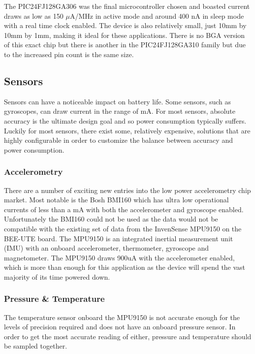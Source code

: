\documentclass[12pt,openany,a4paper]{book}
\begin{document}
		The PIC24FJ128GA306 was the final microcontroller chosen \cite{PIC24} and boasted current draws as low as 150 $\mu$A/MHz in active mode and around 400 nA in sleep mode with a real time clock enabled. The device is also relatively small, just 10mm by 10mm by 1mm, making it ideal for these applications. There is no BGA version of this exact chip but there is another in the PIC24FJ128GA310 family but due to the increased pin count is the same size. 
		
		
		\newpage
		\subsection{Sensors}
		Sensors can have a noticeable impact on battery life. Some sensors, such as gyroscopes, can draw current in the range of mA. For most sensors, absolute accuracy is the ultimate design goal and so power consumption typically suffers. Luckily for most sensors, there exist some, relatively expensive, solutions that are highly configurable in order to customize the balance between accuracy and power consumption. \\
		
			\subsubsection{Accelerometry}
			There are a number of exciting new entries into the low power accelerometry chip market. Most notable is the Bosh BMI160 \cite{bosch15} which has ultra low operational currents of less than a mA with both the accelerometer and gyroscope enabled. \\
			
			Unfortunately the BMI160 could not be used as the data would not be compatible with the existing set of data from the InvenSense MPU9150 \cite{InvenMPU9150} on the BEE-UTE board. The MPU9150 is an integrated inertial measurement unit (IMU) with an onboard accelerometer, thermometer, gyroscope and magnetometer. The MPU9150 draws 900uA with the accelerometer enabled, which is more than enough for this application as the device will spend the vast majority of its time powered down. 
			
			\subsubsection{Pressure \& Temperature}
			The temperature sensor onboard the MPU9150 is not accurate enough for the levels of precision required and does not have an onboard pressure sensor. In order to get the most accurate reading of either, pressure and temperature should be sampled together. \\
			
\end{document}
